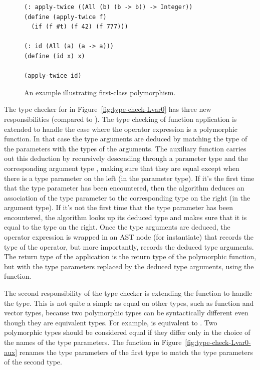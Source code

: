 \documentclass[7x10]{TimesAPriori_MIT}%
\begin{document}
\begin{figure}[tbp]
\begin{lstlisting}
(: apply-twice ((All (b) (b -> b)) -> Integer))
(define (apply-twice f)
  (if (f #t) (f 42) (f 777)))

(: id (All (a) (a -> a)))
(define (id x) x)

(apply-twice id)
\end{lstlisting}
\caption{An example illustrating first-class polymorphism.}
\label{fig:apply-twice}
\end{figure}

The type checker for \LangPoly{} in Figure~\ref{fig:type-check-Lvar0} has
three new responsibilities (compared to \LangLoop{}). The type checking of
function application is extended to handle the case where the operator
expression is a polymorphic function. In that case the type arguments
are deduced by matching the type of the parameters with the types of
the arguments.
%
The  auxiliary function carries out this deduction
by recursively descending through a parameter type  and the
corresponding argument type , making sure that they are equal
except when there is a type parameter on the left (in the parameter
type). If it's the first time that the type parameter has been
encountered, then the algorithm deduces an association of the type
parameter to the corresponding type on the right (in the argument
type). If it's not the first time that the type parameter has been
encountered, the algorithm looks up its deduced type and makes sure
that it is equal to the type on the right.
%
Once the type arguments are deduced, the operator expression is
wrapped in an  AST node (for instantiate) that records the
type of the operator, but more importantly, records the deduced type
arguments. The return type of the application is the return type of
the polymorphic function, but with the type parameters replaced by the
deduced type arguments, using the  function.

The second responsibility of the type checker is extending the
function  to handle the  type.  This is
not quite a simple as equal on other types, such as function and
vector types, because two polymorphic types can be syntactically
different even though they are equivalent types. For example,
 is equivalent to .
Two polymorphic types should be considered equal if they differ only
in the choice of the names of the type parameters. The
 function in Figure~\ref{fig:type-check-Lvar0-aux}
renames the type parameters of the first type to match the type
parameters of the second type.
\end{document}
